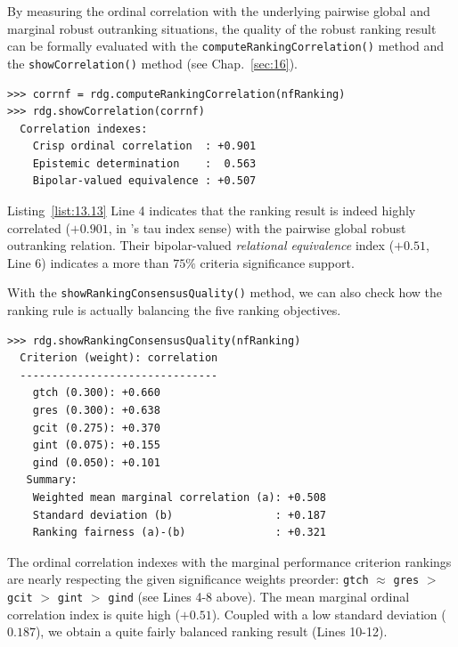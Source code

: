 By measuring the ordinal correlation with the underlying pairwise global and marginal robust outranking situations, the quality of the robust \NetFlows ranking result can be formally evaluated with the \texttt{computeRankingCorrelation()} method and the \texttt{showCorrelation()} method (see Chap.~\ref{sec:16}).
\begin{lstlisting}[caption={Measuring the quality of the \NetFlows ranking result},label=list:13.13]
>>> corrnf = rdg.computeRankingCorrelation(nfRanking)
>>> rdg.showCorrelation(corrnf)   
  Correlation indexes:
    Crisp ordinal correlation  : +0.901
    Epistemic determination    :  0.563
    Bipolar-valued equivalence : +0.507
\end{lstlisting}

Listing~\vref{list:13.13} Line 4 indicates that the \NetFlows ranking result is indeed highly  correlated ($+0.901$, in \Kendall 's tau index sense) with the pairwise global robust outranking relation. Their bipolar-valued \emph{relational equivalence} index ($+0.51$, Line 6) indicates a more than $75\%$ criteria significance support.

With the \texttt{showRankingConsensusQuality()} method,  we can also check how the \NetFlows ranking rule is actually balancing the five ranking objectives.
\begin{lstlisting}[caption={Measuring the consensus quality of the \NetFlows ranking result},label=list:13.14]
>>> rdg.showRankingConsensusQuality(nfRanking)
  Criterion (weight): correlation
  -------------------------------
    gtch (0.300): +0.660
    gres (0.300): +0.638
    gcit (0.275): +0.370
    gint (0.075): +0.155
    gind (0.050): +0.101
   Summary:
    Weighted mean marginal correlation (a): +0.508
    Standard deviation (b)                : +0.187
    Ranking fairness (a)-(b)              : +0.321
\end{lstlisting}

The ordinal correlation indexes with the marginal performance criterion rankings are nearly respecting the given significance weights preorder: \texttt{gtch} $\approx$ \texttt{gres} $>$ \texttt{gcit} $>$ \texttt{gint} $>$ \texttt{gind} (see Lines 4-8 above). The mean marginal ordinal correlation index is quite high ($+0.51$). Coupled with a low standard deviation ($0.187$), we obtain a quite fairly balanced ranking result (Lines 10-12). 

